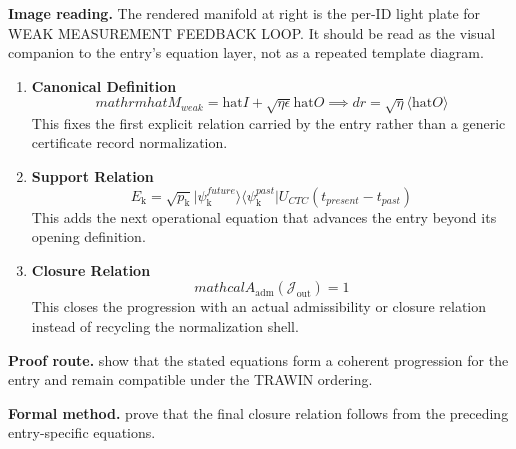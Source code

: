\begin{samepage}
\noindent\begin{minipage}[t]{0.45\linewidth}
\vspace{0pt}
\raggedright
\scriptsize\textbf{Image reading.} The rendered manifold at right is the per-ID light plate for WEAK MEASUREMENT FEEDBACK LOOP. It should be read as the visual companion to the entry's equation layer, not as a repeated template diagram.\par
\end{minipage}\hfill
\begin{minipage}[t]{0.53\linewidth}
\vspace*{-0.10in}
\raggedright
{}
\end{minipage}
\end{samepage}

\clearpage


\begin{enumerate}[leftmargin=1.6em,itemsep=9pt,topsep=6pt]
\item \textbf{Canonical Definition}
\[
mathrm{hat}{M}_{weak} = \mathrm{hat}{I} + \sqrt{\eta\epsilon}\mathrm{hat}{O} \implies dr = \sqrt{\eta}\langle\mathrm{hat}{O}\rangle
\]
This fixes the first explicit relation carried by the entry rather than a generic certificate record normalization.

\item \textbf{Support Relation}
\[
E_{\mathrm{k}} = \sqrt{p_{\mathrm{k}}} \lvert \psi_{\mathrm{k}}^{future} \rangle \langle \psi_{\mathrm{k}}^{past}| U_{CTC}(t_{present} - t_{past})
\]
This adds the next operational equation that advances the entry beyond its opening definition.

\item \textbf{Closure Relation}
\[
mathcal{A}_{\mathrm{adm}}\!\left(\mathcal{J}_{\mathrm{out}}\right)=1
\]
This closes the progression with an actual admissibility or closure relation instead of recycling the normalization shell.
\end{enumerate}

\textbf{Proof route.} show that the stated equations form a coherent progression for the entry and remain compatible under the TRAWIN ordering.

\textbf{Formal method.} prove that the final closure relation follows from the preceding entry-specific equations.

